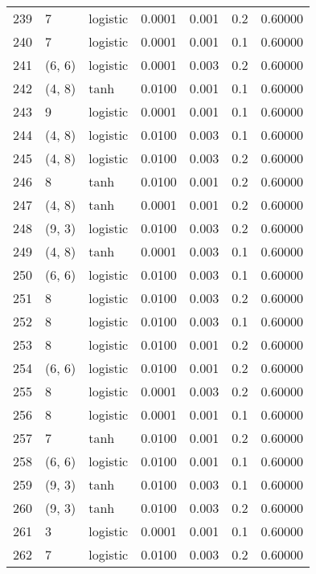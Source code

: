 \begin{tabular}{lllrrrr}
239 &           7 &  logistic &  0.0001 &  0.001 &  0.2 &   0.60000 \\
240 &           7 &  logistic &  0.0001 &  0.001 &  0.1 &   0.60000 \\
241 &      (6, 6) &  logistic &  0.0001 &  0.003 &  0.2 &   0.60000 \\
242 &      (4, 8) &      tanh &  0.0100 &  0.001 &  0.1 &   0.60000 \\
243 &           9 &  logistic &  0.0001 &  0.001 &  0.1 &   0.60000 \\
244 &      (4, 8) &  logistic &  0.0100 &  0.003 &  0.1 &   0.60000 \\
245 &      (4, 8) &  logistic &  0.0100 &  0.003 &  0.2 &   0.60000 \\
246 &           8 &      tanh &  0.0100 &  0.001 &  0.2 &   0.60000 \\
247 &      (4, 8) &      tanh &  0.0001 &  0.001 &  0.2 &   0.60000 \\
248 &      (9, 3) &  logistic &  0.0100 &  0.003 &  0.2 &   0.60000 \\
249 &      (4, 8) &      tanh &  0.0001 &  0.003 &  0.1 &   0.60000 \\
250 &      (6, 6) &  logistic &  0.0100 &  0.003 &  0.1 &   0.60000 \\
251 &           8 &  logistic &  0.0100 &  0.003 &  0.2 &   0.60000 \\
252 &           8 &  logistic &  0.0100 &  0.003 &  0.1 &   0.60000 \\
253 &           8 &  logistic &  0.0100 &  0.001 &  0.2 &   0.60000 \\
254 &      (6, 6) &  logistic &  0.0100 &  0.001 &  0.2 &   0.60000 \\
255 &           8 &  logistic &  0.0001 &  0.003 &  0.2 &   0.60000 \\
256 &           8 &  logistic &  0.0001 &  0.001 &  0.1 &   0.60000 \\
257 &           7 &      tanh &  0.0100 &  0.001 &  0.2 &   0.60000 \\
258 &      (6, 6) &  logistic &  0.0100 &  0.001 &  0.1 &   0.60000 \\
259 &      (9, 3) &      tanh &  0.0100 &  0.003 &  0.1 &   0.60000 \\
260 &      (9, 3) &      tanh &  0.0100 &  0.003 &  0.2 &   0.60000 \\
261 &           3 &  logistic &  0.0001 &  0.001 &  0.1 &   0.60000 \\
262 &           7 &  logistic &  0.0100 &  0.003 &  0.2 &   0.60000 \\

\end{tabular}
